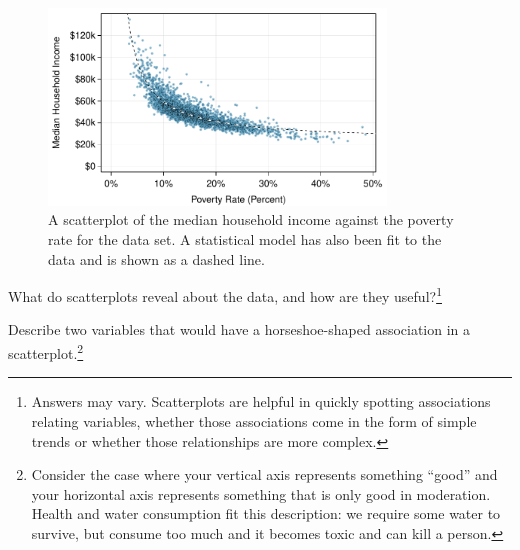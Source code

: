 \begin{figure}[h]
   \centering
   \includegraphics[width=0.8\textwidth]{ch_summarizing_data/figures/medianHHIncomePoverty/medianHHIncomePoverty}
   \caption{A scatterplot of the median household income
       against the poverty rate for the
        data set.
       A statistical model has also been fit to the data
       and is shown as a dashed line.}
   \label{medianHHIncomePoverty}
\end{figure}

\begin{exercise}
What do scatterplots reveal about the data,
and how are they useful?\footnote{Answers may vary.
Scatterplots are helpful in quickly spotting associations
relating variables,
whether those associations come in the form of simple
trends or whether those relationships are more complex.}
\end{exercise}



\begin{exercise}
Describe two variables that would have a horseshoe-shaped
association in a scatterplot.\footnote{Consider the case
  where your vertical axis represents something ``good'' and
  your horizontal axis represents something that is only good
  in moderation.
  Health and water consumption fit this description: we require
  some water to survive, but consume too much and it becomes
  toxic and can kill a person.}
\end{exercise}

